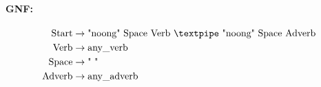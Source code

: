 \paragraph{GNF:}

\begin{equation*}
    \begin{aligned}
        \text{Start} &\rightarrow \text{"noong" Space Verb {\textpipe} "noong" Space Adverb} \\
        \text{Verb} &\rightarrow \text{any\_verb} \\
        \text{Space} &\rightarrow \text{" "} \\
        \text{Adverb} &\rightarrow \text{any\_adverb}
    \end{aligned}
\end{equation*}
